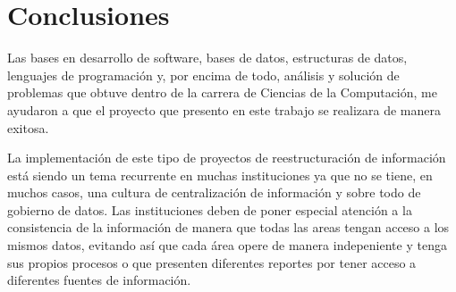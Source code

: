 \chapter{Conclusiones}
\label{cap:conclusiones}

Las bases en desarrollo de software, bases de datos, estructuras de datos,
lenguajes de programación y, por encima de todo, análisis y solución de
problemas que obtuve dentro de la carrera de Ciencias de la Computación, me
ayudaron a que el proyecto que presento en este trabajo se realizara de manera
exitosa.

La implementación de este tipo de proyectos de reestructuración de información 
está siendo un tema recurrente en muchas instituciones ya que no se tiene, en muchos casos, 
una cultura de centralización de información y sobre todo de gobierno de datos. 
Las instituciones deben de poner especial atención a la consistencia de la información de 
manera que todas las areas tengan acceso a los mismos datos, evitando así que cada área 
opere de manera indepeniente y tenga sus propios procesos o que presenten diferentes reportes
por tener acceso a diferentes fuentes de información.


\cleardoublepage

